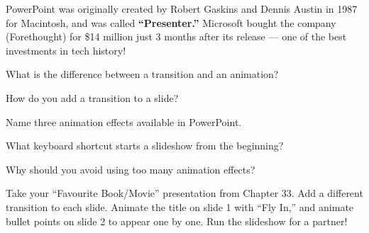 
\begin{funfact}
PowerPoint was originally created by Robert Gaskins and Dennis Austin in 1987 for Macintosh, and was called \textbf{``Presenter.''} Microsoft bought the company (Forethought) for \$14 million just 3 months after its release --- one of the best investments in tech history!
\end{funfact}

\begin{reviewqs}
  \item What is the difference between a transition and an animation?
  \item How do you add a transition to a slide?
  \item Name three animation effects available in PowerPoint.
  \item What keyboard shortcut starts a slideshow from the beginning?
  \item Why should you avoid using too many animation effects?
\end{reviewqs}

\begin{challenge}
Take your ``Favourite Book/Movie'' presentation from Chapter 33. Add a different transition to each slide. Animate the title on slide 1 with ``Fly In,'' and animate bullet points on slide 2 to appear one by one. Run the slideshow for a partner!
\end{challenge}
